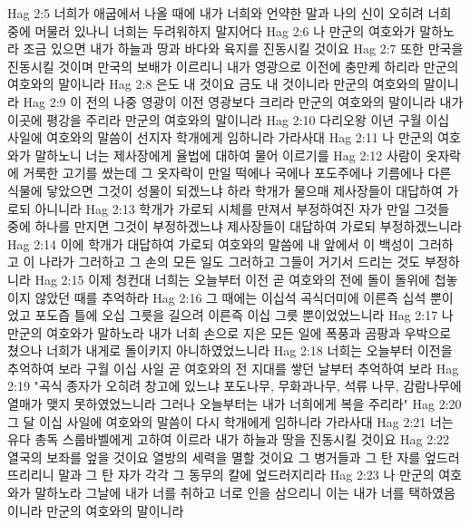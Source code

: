 Hag 2:5  너희가 애굽에서 나올 때에 내가 너희와 언약한 말과 나의 신이 오히려 너희 중에 머물러 있나니 너희는 두려워하지 말지어다
Hag 2:6  나 만군의 여호와가 말하노라 조금 있으면 내가 하늘과 땅과 바다와 육지를 진동시킬 것이요
Hag 2:7  또한 만국을 진동시킬 것이며 만국의 보배가 이르리니 내가 영광으로 이전에 충만케 하리라 만군의 여호와의 말이니라
Hag 2:8  은도 내 것이요 금도 내 것이니라 만군의 여호와의 말이니라
Hag 2:9  이 전의 나중 영광이 이전 영광보다 크리라 만군의 여호와의 말이니라 내가 이곳에 평강을 주리라 만군의 여호와의 말이니라
Hag 2:10  다리오왕 이년 구월 이십 사일에 여호와의 말씀이 선지자 학개에게 임하니라 가라사대
Hag 2:11  나 만군의 여호와가 말하노니 너는 제사장에게 율법에 대하여 물어 이르기를
Hag 2:12  사람이 옷자락에 거룩한 고기를 쌌는데 그 옷자락이 만일 떡에나 국에나 포도주에나 기름에나 다른 식물에 닿았으면 그것이 성물이 되겠느냐 하라 학개가 물으매 제사장들이 대답하여 가로되 아니니라
Hag 2:13  학개가 가로되 시체를 만져서 부정하여진 자가 만일 그것들 중에 하나를 만지면 그것이 부정하겠느냐 제사장들이 대답하여 가로되 부정하겠느니라
Hag 2:14  이에 학개가 대답하여 가로되 여호와의 말씀에 내 앞에서 이 백성이 그러하고 이 나라가 그러하고 그 손의 모든 일도 그러하고 그들이 거기서 드리는 것도 부정하니라
Hag 2:15  이제 청컨대 너희는 오늘부터 이전 곧 여호와의 전에 돌이 돌위에 첩놓이지 않았던 때를 추억하라
Hag 2:16  그 때에는 이십석 곡식더미에 이른즉 십석 뿐이었고 포도즙 틀에 오십 그릇을 길으려 이른즉 이십 그릇 뿐이었었느니라
Hag 2:17  나 만군의 여호와가 말하노라 내가 너희 손으로 지은 모든 일에 폭풍과 곰팡과 우박으로 쳤으나 너희가 내게로 돌이키지 아니하였었느니라
Hag 2:18  너희는 오늘부터 이전을 추억하여 보라 구월 이십 사일 곧 여호와의 전 지대를 쌓던 날부터 추억하여 보라
Hag 2:19  "곡식 종자가 오히려 창고에 있느냐 포도나무, 무화과나무, 석류 나무, 감람나무에 열매가 맺지 못하였었느니라 그러나 오늘부터는 내가 너희에게 복을 주리라"
Hag 2:20  그 달 이십 사일에 여호와의 말씀이 다시 학개에게 임하니라 가라사대
Hag 2:21  너는 유다 총독 스룹바벨에게 고하여 이르라 내가 하늘과 땅을 진동시킬 것이요
Hag 2:22  열국의 보좌를 엎을 것이요 열방의 세력을 멸할 것이요 그 병거들과 그 탄 자를 엎드러뜨리리니 말과 그 탄 자가 각각 그 동무의 칼에 엎드러지리라
Hag 2:23  나 만군의 여호와가 말하노라 그날에 내가 너를 취하고 너로 인을 삼으리니 이는 내가 너를 택하였음이니라 만군의 여호와의 말이니라


